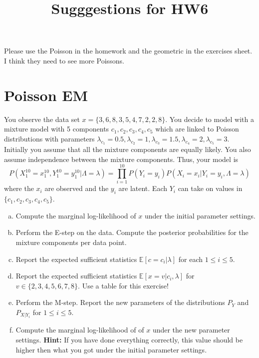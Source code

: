 \documentclass[11pt, a4paper]{article}
\title{Sugggestions for HW6}
\begin{document}
Please use the Poisson in the homework and the geometric in the exercises sheet. I think they need to see more Poissons.

\section{Poisson EM}

You observe the data set $ x = \{3, 6, 8, 3, 5, 4, 7, 2, 2, 8\} $. You decide to model with a mixture model with 5 components $ c_{1}, c_{2}, c_{3}, c_{4}, c_{5} $ which
are linked to Poisson distributions with parameters $ \lambda_{c_{1}} = 0.5, \lambda_{c_{2}} = 1, \lambda_{c_{3}} = 1.5, \lambda_{c_{4}} = 2, \lambda_{c_{5}} = 3 $. 
Initially you assume that all the mixture components are equally likely. You
also assume independence between the mixture components. Thus, your model is
\begin{equation*}
P(X_{1}^{10}=x_{1}^{10},Y_{1}^{10}=y_{1}^{10}|\Lambda=\lambda) = \prod_{i=1}^{10}P(Y_{i}=y_{i})P(X_{i}=x_{i}|Y_{i}=y_{i},\Lambda=\lambda)
\end{equation*}
where the $ x_{i} $ are observed and the $ y_{i} $ are latent. Each $ Y_{i} $ can take on values in $ \{ c_{1}, c_{2}, c_{3}, c_{4}, c_{5} \} $.

\begin{enumerate}[a)]
\item Compute the marginal log-likelihood of $ x $ under the initial parameter settings.
\item Perform the E-step on the data. Compute the posterior probabilities for the mixture components per data point.
\item Report the expected sufficient statistics $ \mathbb{E}[c=c_{i}|\lambda] $ for each $ 1 \leq i \leq 5 $. 
\item Report the expected sufficient statistics $ \mathbb{E}[x=v|c_{i},\lambda] $ for $ v \in \{2,3,4,5,6,7,8\} $. Use a table for this exercise!
\item Perform the M-step. Report the new parameters of the distributions $ P_{Y} $ and $ P_{X|Y_{i}} $ for  $ 1 \leq i \leq 5 $.
\item Compute the marginal log-likelihood of of $ x $ under the new parameter settings. \textbf{Hint:} If you have done everything correctly, this value should
be higher then what you got under the initial parameter settings.
\end{enumerate}
\end{document}
